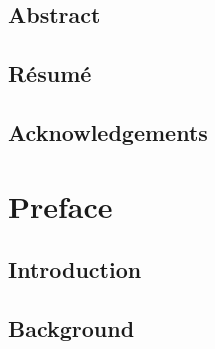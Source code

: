 \documentclass[crop]{style/umemoir} %
\author{First Name LAST NAME} %
\begin{document}

\MyTitlePage

\frontmatter %








\chapter*{Abstract}


\chapter*{R\'esum\'e}



\chapter*{Acknowledgements}



\cleardoublepage
\setcounter{tocdepth}{1}
\tableofcontents
{}


\mainmatter %

\part{Preface}
\label{part:preface}


\chapter{Introduction}
\label{chapter:introduction}



\chapter{Background}
\label{chapter:background}
%
\end{document}
